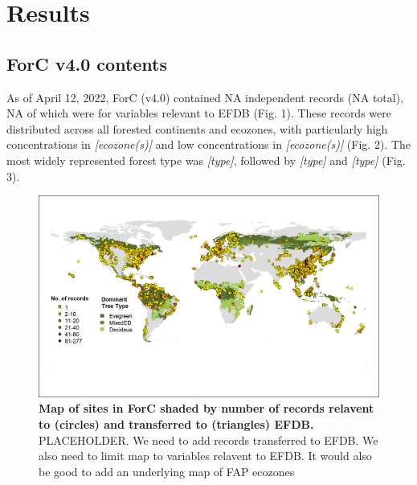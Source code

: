 \documentclass[, manuscript]{copernicus}
\begin{document}
\section{Results}

\subsection{ForC v4.0 contents}

As of April 12, 2022, ForC (v4.0) contained NA independent records (NA
total), NA of which were for variables relevant to EFDB (Fig. 1). These
records were distributed across all forested continents and ecozones,
with particularly high concentrations in \emph{{[}ecozone(s){]}} and low
concentrations in \emph{{[}ecozone(s){]}} (Fig. 2). The most widely
represented forest type was \emph{{[}type{]}}, followed by
\emph{{[}type{]}} and \emph{{[}type{]}} (Fig. 3).

\begin{figure}
\includegraphics[width=15cm]{figures_tables/PLACEHOLDER_World_Map_of_sites} \caption{\textbf{Map of sites in ForC shaded by number of records relavent to (circles) and transferred to (triangles) EFDB.} PLACEHOLDER. We need to add records transferred to EFDB. We also need to limit map to variables relavent to EFDB. It would also be good to add an underlying map of FAP ecozones}\label{fig:fig_map}
\end{figure}
\end{document}
